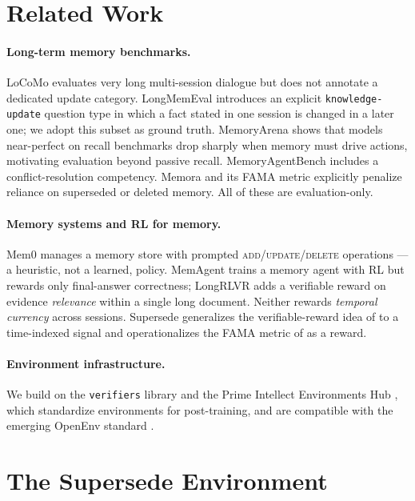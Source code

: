 \documentclass[]{ceurart}
\begin{document}
\section{Related Work}

\paragraph{Long-term memory benchmarks.} LoCoMo \cite{maharana2024locomo}
evaluates very long multi-session dialogue but does not annotate a dedicated
update category. LongMemEval \cite{wu2025longmemeval} introduces an explicit
\texttt{knowledge-update} question type in which a fact stated in one session
is changed in a later one; we adopt this subset as ground truth. MemoryArena
\cite{memoryarena2026} shows that models near-perfect on recall benchmarks
drop sharply when memory must drive actions, motivating evaluation beyond
passive recall. MemoryAgentBench \cite{memoryagentbench2025} includes a
conflict-resolution competency. Memora and its FAMA metric \cite{fama2026}
explicitly penalize reliance on superseded or deleted memory. All of these are
evaluation-only.

\paragraph{Memory systems and RL for memory.} Mem0 \cite{chhikara2025mem0}
manages a memory store with prompted \textsc{add}/\textsc{update}/\textsc{delete}
operations --- a heuristic, not a learned, policy. MemAgent
\cite{memagent2025} trains a memory agent with RL but rewards only
final-answer correctness; LongRLVR \cite{longrlvr2026} adds a verifiable
reward on evidence \emph{relevance} within a single long document. Neither
rewards \emph{temporal currency} across sessions. Supersede generalizes the
verifiable-reward idea of \cite{longrlvr2026} to a time-indexed signal and
operationalizes the FAMA metric of \cite{fama2026} as a reward.

\paragraph{Environment infrastructure.} We build on the \texttt{verifiers}
library and the Prime Intellect Environments Hub
\cite{primeintellect2025environments}, which standardize environments for
post-training, and are compatible with the emerging OpenEnv standard
\cite{openenv2025}.

\section{The Supersede Environment}
\label{sec:env}
\end{document}
